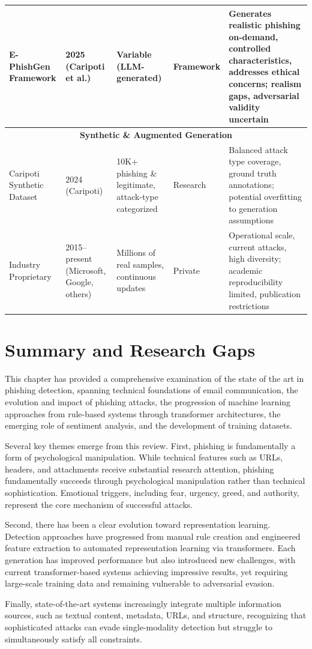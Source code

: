 \begin{table}[ht]
\begin{tabular}{|p{2.3cm}|p{2cm}|p{2.4cm}|p{1.5cm}|p{4.5cm}|}
E-PhishGen Framework & 2025 (Caripoti et al.) & Variable (\ac{LLM}-generated) & Framework & Generates realistic phishing on-demand, controlled characteristics, addresses ethical concerns; realism gaps, adversarial validity uncertain \\ \hline
\multicolumn{5}{|c|}{\textbf{Synthetic \& Augmented Generation}} \\ \hline
Caripoti Synthetic Dataset & 2024 (Caripoti) & 10K+ phishing \& legitimate, attack-type categorized & Research & Balanced attack type coverage, ground truth annotations; potential overfitting to generation assumptions \\ \hline
Industry Proprietary & 2015--present (Microsoft, Google, others) & Millions of real samples, continuous updates & Private & Operational scale, current attacks, high diversity; academic reproducibility limited, publication restrictions \\ \hline
\end{tabular}
\end{table}

\section{Summary and Research Gaps}

This chapter has provided a comprehensive examination of the state of the art in phishing detection, spanning technical foundations of email communication, the evolution and impact of phishing attacks, the progression of machine learning approaches from rule-based systems through transformer architectures, the emerging role of sentiment analysis, and the development of training datasets.

Several key themes emerge from this review. First, phishing is fundamentally a form of psychological manipulation. While technical features such as URLs, headers, and attachments receive substantial research attention, phishing fundamentally succeeds through psychological manipulation rather than technical sophistication. Emotional triggers, including fear, urgency, greed, and authority, represent the core mechanism of successful attacks.

Second, there has been a clear evolution toward representation learning. Detection approaches have progressed from manual rule creation and engineered feature extraction to automated representation learning via transformers. Each generation has improved performance but also introduced new challenges, with current transformer-based systems achieving impressive results, yet requiring large-scale training data and remaining vulnerable to adversarial evasion.

Finally, state-of-the-art systems increasingly integrate multiple information sources, such as textual content, metadata, URLs, and structure, recognizing that sophisticated attacks can evade single-modality detection but struggle to simultaneously satisfy all constraints.